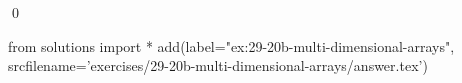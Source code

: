 
\begin{ex} 
  \label{ex:29-20b-multi-dimensional-arrays}
  
  \qed
\end{ex} 
\begin{python0}
from solutions import *
add(label="ex:29-20b-multi-dimensional-arrays",
    srcfilename='exercises/29-20b-multi-dimensional-arrays/answer.tex') 
\end{python0}

